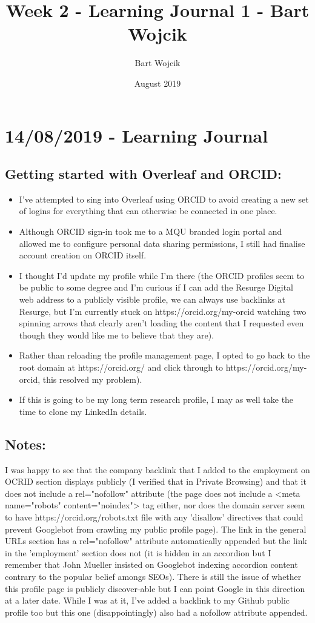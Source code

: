 \documentclass{article}
\title{Week 2 - Learning Journal 1 - Bart Wojcik}
\author{Bart Wojcik}
\date{August 2019}
\begin{document}
\maketitle

\section{14/08/2019 - Learning Journal}
\subsection{Getting started with Overleaf and ORCID:}
\medskip
\begin{itemize}
    \item I've attempted to sing into Overleaf using ORCID to avoid creating a new set of logins for everything that can otherwise be connected in one place.
    \item Although ORCID sign-in took me to a MQU branded login portal and allowed me to configure personal data sharing permissions, I still had finalise account creation on ORCID itself. 
    \item I thought I'd update my profile while I'm there (the ORCID profiles seem to be public to some degree and I'm curious if I can add the Resurge Digital web address to a publicly visible profile, we can always use backlinks at Resurge, but I'm currently stuck on https://orcid.org/my-orcid watching two spinning arrows that clearly aren't loading the content that I requested even though they would like me to believe that they are). 
    \item Rather than reloading the profile management page, I opted to go back to the root domain at https://orcid.org/ and click through to https://orcid.org/my-orcid, this resolved my problem). 
    \item If this is going to be my long term research profile, I may as well take the time to clone my LinkedIn details. 
\end{itemize}
\subsection{Notes:}
I was happy to see that the company backlink that I added to the employment on OCRID section displays publicly (I verified that in Private Browsing) and that it does not include a rel="nofollow" attribute (the page does not include a <meta name="robots" content="noindex"> tag either, nor does the domain server seem to have https://orcid.org/robots.txt file with any 'disallow' directives that could prevent Googlebot from crawling my public profile page). The link in the general URLs section has a rel="nofollow" attribute automatically appended but the link in the 'employment' section does not (it is hidden in an accordion but I remember that John Mueller insisted on Googlebot indexing accordion content contrary to the popular belief amongs SEOs). There is still the issue of whether this profile page is publicly discover-able but I can point Google in this direction at a later date. While I was at it, I've added a backlink to my Github public profile too but this one (disappointingly) also had a nofollow attribute appended.
\end{document}
